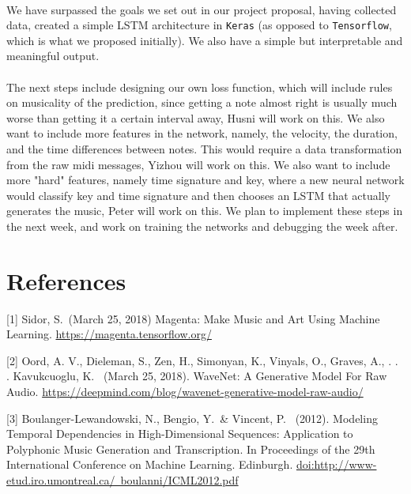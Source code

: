 \documentclass[final]{article}
\begin{document}
\paragraph{}We have surpassed the goals we set out in our project proposal, having collected data, created a simple LSTM architecture in \texttt{Keras} (as opposed to \texttt{Tensorflow}, which is what we proposed initially). We also have a simple but interpretable and meaningful output. 
\paragraph{}The next steps include designing our own loss function, which will include rules on musicality of the prediction, since getting a note almost right is usually much worse than getting it a certain interval away, Husni will work on this. We also want to include more features in the network, namely, the velocity, the duration, and the time differences between notes. This would require a data transformation from the raw midi messages, Yizhou will work on this. We also want to include more "hard" features, namely time signature and key, where a new neural network would classify key and time signature and then chooses an LSTM that actually generates the music, Peter will work on this. We plan to implement these steps in the next week, and work on training the networks and debugging the week after.

\section*{References}

\medskip

\small

[1] Sidor, S.\ (March 25, 2018) Magenta: Make Music and Art Using Machine Learning. \href{url}{https://magenta.tensorflow.org/}

[2] Oord, A. V., Dieleman, S., Zen, H., Simonyan, K., Vinyals, O., Graves, A., . . . Kavukcuoglu, K. \ (March 25, 2018). WaveNet: A Generative Model For Raw Audio.  \href{url}{https://deepmind.com/blog/wavenet-generative-model-raw-audio/}

[3] Boulanger-Lewandowski, N., Bengio, Y.\ \& Vincent, P. \ (2012). Modeling Temporal Dependencies in High-Dimensional Sequences: Application to Polyphonic Music Generation and Transcription. In Proceedings of the 29th International Conference on Machine Learning. Edinburgh. \href{url}{doi:http://www-etud.iro.umontreal.ca/~boulanni/ICML2012.pdf}
\end{document}

